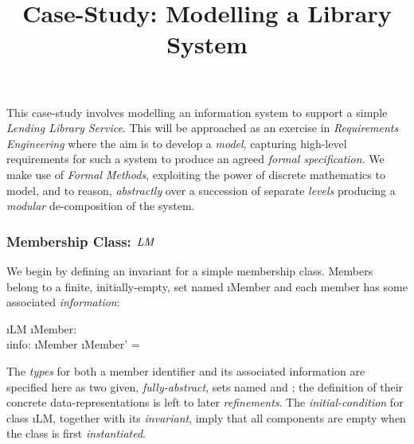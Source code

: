 \documentclass[12pt,a4paper]{article}
\title{Case-Study: Modelling a Library System}
\date{}
\newcounter{exer} %
\begin{document}
\maketitle

\vspace{-1cm}
\noindent This case-study involves modelling an information system to support a simple
\emph{Lending Library Service}. This will be approached as an exercise in
\emph{Requirements Engineering}
where the aim is to develop a \emph{model}, capturing
high-level requirements for such a system
to produce an agreed \emph{formal specification}.
We make use of \emph{Formal Methods},
exploiting the power of discrete mathematics
to model, and to reason, \emph{abstractly} over a succession of separate \emph{levels}
producing a \emph{modular} de-composition of the system.



\subsubsection*{Membership Class: $\mathit{LM}$}

We begin by defining an invariant for a simple membership class. Members belong to a finite, initially-empty,
set named \i{Member} and each member has some associated \emph{information}:
\begin{showspecs}
	\begin{spec}{\i{LM}}
		\i{Member}: \;\\
		\i{info}: \i{Member} \tfun {}
	\post	\i{Member'} = \emptyset
	\end{spec}
\end{showspecs}

\noindent
The \emph{types} for both a member identifier and its
associated information are specified here as two given, \emph{fully-abstract}, sets named  and ;
the definition of their concrete data-representations is left to later \emph{refinements}.
The \emph{initial-condition} for class \i{LM},
together with its \emph{invariant}, imply that all components
are empty when the class is first \emph{instantiated}.
\end{document}
